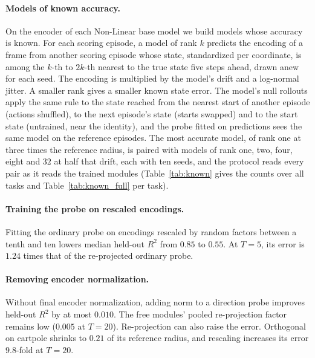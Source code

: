 









\paragraph{Models of known accuracy.}
\label{app:known}
On the encoder of each Non-Linear base model we build models whose accuracy is known. For each scoring episode, a model of rank $k$ predicts the encoding of a frame from another scoring episode whose state, standardized per coordinate, is among the $k$-th to $2k$-th nearest to the true state five steps ahead, drawn anew for each seed. The encoding is multiplied by the model's drift and a log-normal jitter. A smaller rank gives a smaller known state error. The model's null rollouts apply the same rule to the state reached from the nearest start of another episode (actions shuffled), to the next episode's state (starts swapped) and to the start state (untrained, near the identity), and the probe fitted on predictions sees the same model on the reference episodes. The most accurate model, of rank one at three times the reference radius, is paired with models of rank one, two, four, eight and $32$ at half that drift, each with ten seeds, and the protocol reads every pair as it reads the trained modules (Table~\ref{tab:known} gives the counts over all tasks and Table~\ref{tab:known_full} per task).




\paragraph{Training the probe on rescaled encodings.} Fitting the ordinary probe on encodings rescaled by random factors between a tenth and ten lowers median held-out $R^2$ from $0.85$ to $0.55$. At $T=5$, its error is $1.24$ times that of the re-projected ordinary probe. 

\paragraph{Removing encoder normalization.} Without final encoder normalization, adding norm to a direction probe improves held-out $R^2$ by at most $0.010$. The free modules' pooled re-projection factor remains low ($0.005$ at $T=20$). Re-projection can also raise the error. Orthogonal on cartpole shrinks to $0.21$ of its reference radius, and rescaling increases its error $9.8$-fold at $T=20$.

